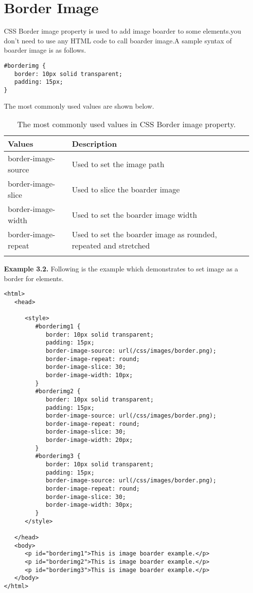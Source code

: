 \documentclass[a4paper,oneside]{book}
\numberwithin{equation}{chapter}
\begin{document}
\section{Border Image}
CSS Border image property is used to add image boarder to some elements.you don't need to use any HTML code to call boarder image.A sample syntax of boarder image is as follows.
\begin{verbatim}
#borderimg {
   border: 10px solid transparent;
   padding: 15px;
}
\end{verbatim}
The most commonly used values are shown below.
\begin{center}
\begin{longtable}{|l|p{8cm}|}
\hline
\textbf{Values} & \textbf{Description}\\
\hline
border-image-source & Used to set the image path\\
\hline
border-image-slice & Used to slice the boarder image\\
\hline
border-image-width & Used to set the boarder image width\\
\hline
border-image-repeat & Used to set the boarder image as rounded, repeated and stretched\\
\hline
\caption{The most commonly used values in CSS Border image property.}
\end{longtable}
\end{center}
\textbf{Example 3.2.} Following is the example which demonstrates to set image as a border for elements.
\begin{verbatim}
<html>
   <head>
   
      <style>
         #borderimg1 { 
            border: 10px solid transparent;
            padding: 15px;
            border-image-source: url(/css/images/border.png);
            border-image-repeat: round;
            border-image-slice: 30;
            border-image-width: 10px;
         }
         #borderimg2 { 
            border: 10px solid transparent;
            padding: 15px;
            border-image-source: url(/css/images/border.png);
            border-image-repeat: round;
            border-image-slice: 30;
            border-image-width: 20px;
         }
         #borderimg3 { 
            border: 10px solid transparent;
            padding: 15px;
            border-image-source: url(/css/images/border.png);
            border-image-repeat: round;
            border-image-slice: 30;
            border-image-width: 30px;
         }
      </style>
      
   </head>
   <body>
      <p id="borderimg1">This is image boarder example.</p>
      <p id="borderimg2">This is image boarder example.</p>
      <p id="borderimg3">This is image boarder example.</p>
   </body>
</html> 
\end{verbatim}
\end{document}
